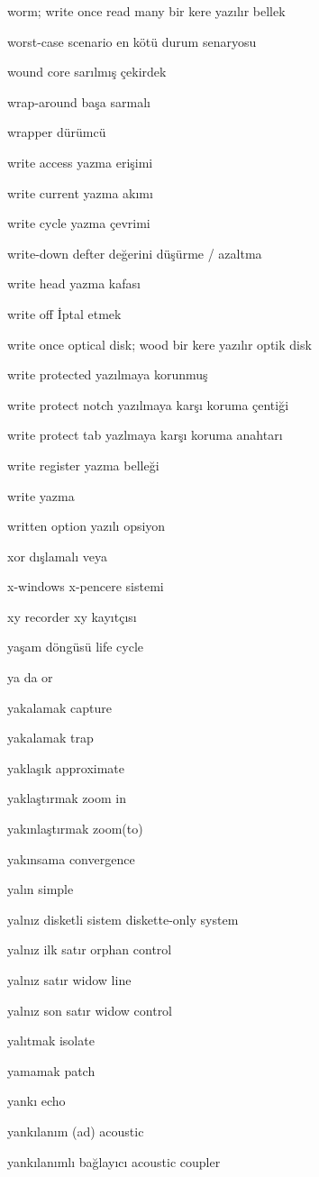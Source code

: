 \documentclass[12pt,fleqn]{article}\usepackage{../../common}
\begin{document}
worm; write once read many bir kere yazılır bellek

worst-case scenario en kötü durum senaryosu

wound core sarılmış çekirdek

wrap-around başa sarmalı

wrapper dürümcü

write access yazma erişimi

write current yazma akımı

write cycle yazma çevrimi

write-down defter değerini düşürme / azaltma

write head yazma kafası

write off İptal etmek

write once optical disk; wood bir kere yazılır optik disk

write protected yazılmaya korunmuş

write protect notch yazılmaya karşı koruma çentiği

write protect tab yazlmaya karşı koruma anahtarı

write register yazma belleği

write yazma

written option yazılı opsiyon

xor dışlamalı veya

x-windows x-pencere sistemi

xy recorder xy kayıtçısı

yaşam döngüsü life cycle

ya da or

yakalamak capture

yakalamak trap

yaklaşık approximate

yaklaştırmak zoom in

yakınlaştırmak zoom(to)

yakınsama convergence

yalın simple

yalnız disketli sistem diskette-only system

yalnız ilk satır orphan control

yalnız satır widow line

yalnız son satır widow control

yalıtmak isolate

yamamak patch

yankı echo

yankılanım (ad) acoustic

yankılanımlı bağlayıcı acoustic coupler
\end{document}

